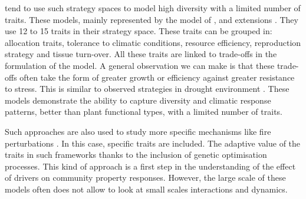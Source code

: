  tend to use such strategy spaces to model high diversity with a limited number of traits. These models, mainly represented by the model of \cite{kleidon_global_2000}, and extensions \cite{reu_role_2011, pavlick_jena_2013}. They use 12 to 15 traits in their strategy space. These traits can be grouped in: allocation traits, tolerance to climatic conditions, resource efficiency, reproduction strategy and tissue turn-over. All these traits are linked to trade-offs in the formulation of the model. A general observation we can make is that these trade-offs often take the form of greater growth or efficiency against greater resistance to stress. This is similar to observed strategies in drought environment \parencite{kooyers_evolution_2015}. These models \parencite{reu_role_2011, pavlick_jena_2013} demonstrate the ability to capture diversity and climatic response patterns, better than plant functional types, with a limited number of traits.


Such approaches are also used to study more specific mechanisms like fire perturbations \parencite{scheiter_next-generation_2013}. In this case, specific traits are included. The adaptive value of the traits in such frameworks thanks to the inclusion of genetic optimisation processes. This kind of approach is a first step in the understanding of the effect of drivers on community property responses. However, the large scale of these models often does not allow to look at small scales interactions and dynamics.


